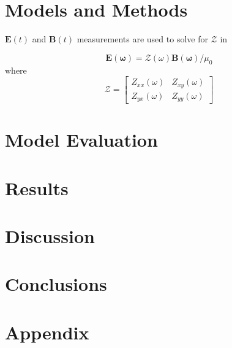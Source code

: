 \documentclass[draft,linenumbers]{agujournal2018}
\begin{document}
\section{Models and Methods}
\label{section:Models_and_Methods}

$\mathbf{E}(t)$ and $\mathbf{B}(t)$ measurements are used to solve for $\mathcal{Z}$ in

\begin{linenomath*}
    \begin{equation}
    \mathbf{E(\omega)} = \mathcal{Z(\omega)}\mathbf{B(\omega)}/\mu_0
    \end{equation}
    \noindent where
    \begin{equation}
    \mathcal{Z} = 
    \begin{bmatrix}
    Z_{xx}(\omega) & Z_{xy}(\omega)\\
    Z_{yx}(\omega) & Z_{yy}(\omega)
    \end{bmatrix}
    \end{equation}
    \end{linenomath*}

\noindent

\section{Model Evaluation}
\label{section:Model_Evaluation}

\section{Results}
\label{Results}

\section{Discussion}
\label{Discussion}

\section{Conclusions}

\clearpage

\section{Appendix}
\end{document}
